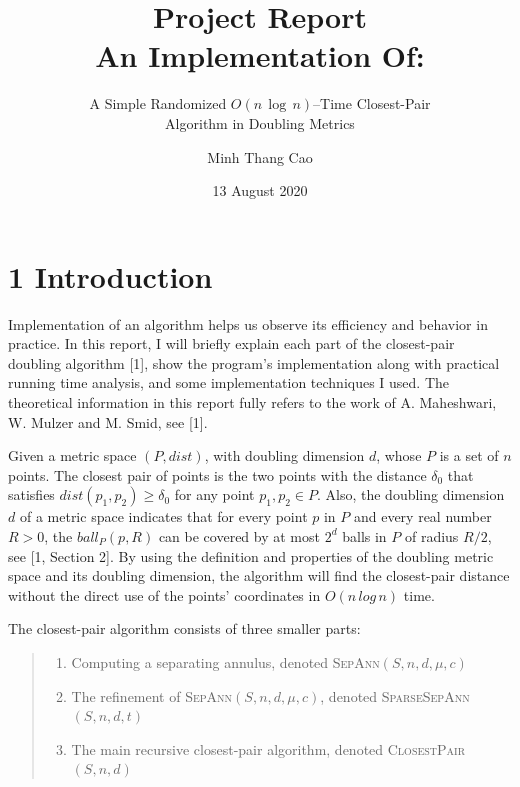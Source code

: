 \documentclass[12pt,english,]{article}
\title{\textbf{Project Report}\\
\Large{An Implementation Of:}}
\subtitle{A Simple Randomized \(O(n\,\log\, n)\)--Time Closest-Pair\\
Algorithm in Doubling Metrics}
\author{Minh Thang Cao}
\date{13 August 2020}
\begin{document}
\maketitle

\hypertarget{section1}{%
\section{\texorpdfstring{1
\enspace Introduction}{1 Introduction}}\label{section1}}

Implementation of an algorithm helps us observe its efficiency and
behavior in practice. In this report, I will briefly explain each part
of the closest-pair doubling algorithm {[}1{]}, show the program's
implementation along with practical running time analysis, and some
implementation techniques I used. The theoretical information in this
report fully refers to the work of A. Maheshwari, W. Mulzer and M. Smid,
see {[}1{]}.

Given a metric space \((P,dist)\), with doubling dimension \(d\), whose
\(P\) is a set of \(n\) points. The closest pair of points is the two
points with the distance \(\delta_0\) that satisfies
\(dist(p_1, p_2) \geq \delta_0\) for any point \(p_1, p_2 \in P\). Also,
the doubling dimension \(d\) of a metric space indicates that for every
point \(p\) in \(P\) and every real number \(R > 0\), the
\(ball_P(p, R)\) can be covered by at most \(2^d\) balls in \(P\) of
radius \(R/2\), see {[}1, Section 2{]}. By using the definition and
properties of the doubling metric space and its doubling dimension, the
algorithm will find the closest-pair distance without the direct use of
the points' coordinates in \(O(n\,log\,n)\) time.

The closest-pair algorithm consists of three smaller parts:

\vspace{-2.5truemm}

\begin{quote}
\begin{enumerate}
\item Computing a separating annulus, denoted \textsc{SepAnn}$(S,n,d,\mu,c)$
\item The refinement of \textsc{SepAnn}$(S,n,d,\mu,c)$, denoted \textsc{SparseSepAnn}$(S,n,d,t)$
\item The main recursive closest-pair algorithm, denoted \textsc{ClosestPair}$(S,n,d)$
\end{enumerate}
\end{quote}
\end{document}
